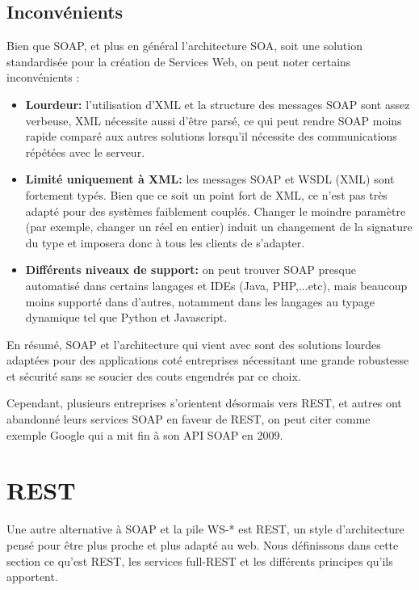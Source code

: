 \subsection{Inconvénients}
Bien que SOAP, et plus en général l'architecture SOA, soit une solution standardisée pour la création de Services Web, on peut noter certains inconvénients :
\begin{itemize}
	\item \textbf{Lourdeur:} l'utilisation d'XML et la structure des messages SOAP sont assez verbeuse, XML nécessite aussi d'être parsé, ce qui peut rendre SOAP moins rapide comparé aux autres solutions lorsqu'il nécessite des communications répétées avec le serveur.
	\item \textbf{Limité uniquement à XML:} les messages SOAP et WSDL (XML) sont fortement typés. Bien que ce soit un point fort de XML, ce n'est pas très adapté pour des systèmes faiblement couplés. Changer le moindre paramètre (par exemple, changer un réel en entier) induit un changement de la signature du type et imposera donc à tous les clients de s'adapter.
	\item \textbf{Différents niveaux de support:} on peut trouver SOAP presque automatisé dans certains langages et IDEs (Java, PHP,...etc), mais beaucoup moins supporté dans d'autres, notamment dans les langages au typage dynamique tel que Python et Javascript.
\end{itemize}

En résumé, SOAP et l'architecture qui vient avec sont des solutions lourdes adaptées pour des applications coté entreprises nécessitant une grande robustesse et sécurité sans se soucier des couts engendrés par ce choix.

Cependant, plusieurs entreprises s'orientent désormais vers REST, et autres ont abandonné leurs services SOAP en faveur de REST, on peut citer comme exemple Google qui a mit fin à son API SOAP en 2009.
\newpage

\section{REST}
\label{section:Rest}
Une autre alternative à SOAP et la pile WS-* est REST, un style d'architecture pensé pour être plus proche et plus adapté au web. Nous définissons dans cette section ce qu'est REST, les services full-REST et les différents principes qu'ils apportent.

